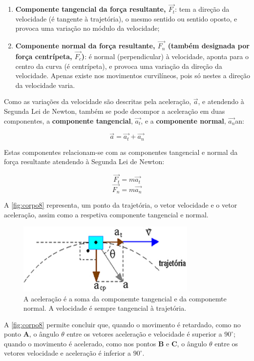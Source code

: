 \documentclass[a4paper,11pt,oneside]{report}
\begin{document}
\begin{enumerate}
    \item \textbf{Componente tangencial da força resultante, $\overrightarrow{F_t}$}: tem a direção da velocidade (é tangente à trajetória), o mesmo sentido ou sentido oposto, e provoca uma variação no módulo da velocidade;
    \item \textbf{Componente normal da força resultante, $\overrightarrow{F_n}$ (também designada por força centrípeta, $\overrightarrow{F_c}$)}: é normal (perpendicular) à velocidade, aponta para o centro da curva (é centrípeta), e provoca uma variação da direção da velocidade. Apenas existe nos movimentos curvilíneos, pois só nestes a direção da velocidade varia.
\end{enumerate}

Como as variações da velocidade são descritas pela aceleração, $\vec a$, 
e atendendo à Segunda Lei de Newton, também se pode decompor a aceleração 
em duas componentes, a \textbf{componente tangencial}, $\overrightarrow{a_t}$, 
e a \textbf{componente normal}, $\overrightarrow{a_n}$an: 

\[
\vec a = \overrightarrow{a_t} + \overrightarrow{a_n}
\]

Estas componentes relacionam-se com as componentes tangencial e
normal da força resultante atendendo à Segunda Lei de Newton:

\[
\overrightarrow{F_t} = m\overrightarrow{a_t} 
\]
\[
\overrightarrow{F_n} = m\overrightarrow{a_n}
\]

A \autoref{fig:corpo8} representa, um ponto da trajetória, o vetor velocidade 
e o vetor aceleração, assim como a respetiva componente tangencial e 
normal.

\begin{figure}[H]
    \center
    \includegraphics[height=100pt]{figuras/avv.jpg}
    \caption{A aceleração é a soma da componemte tangencial e da componemte normal.
    A velocidade é sempre tangencial à trajetória.}
    \label{fig:corpo8}
\end{figure}

A \autoref{fig:corpo8} permite concluir que, quando o movimento é retardado, como no 
ponto \textbf{A}, o ângulo $\theta$ entre os vetores aceleração e velocidade 
é superior a $90^\circ$; quando o movimento é acelerado, como nos pontos \textbf{B} 
e \textbf{C}, o ângulo $\theta$ entre os vetores velocidade e aceleração é inferior 
a $90^\circ$. 
\end{document}
